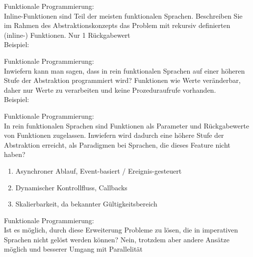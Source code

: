 \begin{card}
	Funktionale Programmierung:\\
	Inline-Funktionen sind Teil der meisten funktionalen Sprachen. Beschreiben Sie im Rahmen des Abstraktionskonzepts das Problem mit rekursiv definierten (inline-) Funktionen.
	\hr
	Nur 1 Rückgabewert\\
	Beispiel:
\end{card}

\begin{card}
	Funktionale Programmierung:\\
	Inwiefern kann man sagen, dass in rein funktionalen Sprachen auf einer höheren Stufe der Abstraktion programmiert wird?
	\hr
	Funktionen wie Werte veränderbar, daher nur Werte zu verarbeiten und keine Prozeduraufrufe vorhanden.\\
	Beispiel: 
\end{card}

\begin{card}
	Funktionale Programmierung:\\
	In rein funktionalen Sprachen sind Funktionen als Parameter und Rückgabewerte von Funktionen zugelassen. Inwiefern wird dadurch eine höhere Stufe der Abstraktion erreicht, als Paradigmen bei Sprachen, die dieses Feature nicht haben?
	\hr
	\begin{enumerate}
	\item Asynchroner Ablauf, Event-basiert / Ereignis-gesteuert
	\item Dynamischer Kontrollfluss, Callbacks
	\item Skalierbarkeit, da bekannter Gültigkeitsbereich
	\end{enumerate}
\end{card}

\begin{card}
	Funktionale Programmierung:\\
	Ist es möglich, durch diese Erweiterung Probleme zu lösen, die in imperativen Sprachen nicht gelöst werden können?
	\hr
	Nein, trotzdem aber andere Ansätze möglich und besserer Umgang mit Parallelität
\end{card}